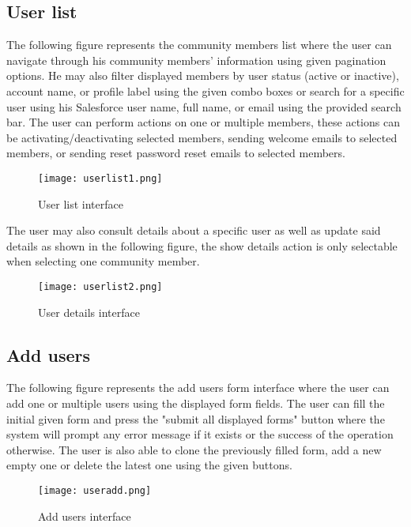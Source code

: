 \subsection{User list }
The following figure represents the community members list where the user can navigate through his community members' information using given pagination options. He may also filter displayed members by user status (active or inactive), account name, or profile label using the given combo boxes or search for a specific user using his Salesforce user name, full name, or email using the provided search bar. The user can perform actions on one or multiple members, these actions can be activating/deactivating selected members, sending welcome emails to selected members, or sending reset password reset emails to selected members. 

\begin{figure}[H]%
    \center   
    \texttt{[image: userlist1.png]}
    \caption{User list interface}
\end{figure}
The user may also consult details about a specific user as well as update said details as shown in the following figure, the show details action is only selectable when selecting one community member.
\begin{figure}[H]%
    \center   
    \texttt{[image: userlist2.png]}
    \caption{User details interface}
\end{figure}

\subsection{Add users}
The following figure represents the add users form interface where the user can add one or multiple users using the displayed form fields. The user can fill the initial given form and press the "submit all displayed forms" button where the system will prompt any error message if it exists or the success of the operation otherwise. The user is also able to clone the previously filled form, add a new empty one or delete the latest one using the given buttons.
\begin{figure}[H]%
    \center   
    
    \texttt{[image: useradd.png]}
    \caption{Add users interface}
\end{figure}
